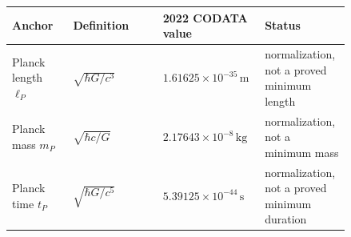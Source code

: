 {\small
\begin{longtable}{L{0.17\linewidth}L{0.25\linewidth}L{0.22\linewidth}L{0.20\linewidth}}
\toprule
Anchor & Definition & 2022 CODATA value & Status\\
\midrule
Planck length $\ell_P$ & $\sqrt{\hbar G/c^3}$ & $1.61625\times 10^{-35}\,\mathrm{m}$ & normalization, not a proved minimum length\\
Planck mass $m_P$ & $\sqrt{\hbar c/G}$ & $2.17643\times 10^{-8}\,\mathrm{kg}$ & normalization, not a minimum mass\\
Planck time $t_P$ & $\sqrt{\hbar G/c^5}$ & $5.39125\times 10^{-44}\,\mathrm{s}$ & normalization, not a proved minimum duration\\
\bottomrule
\end{longtable}
}
